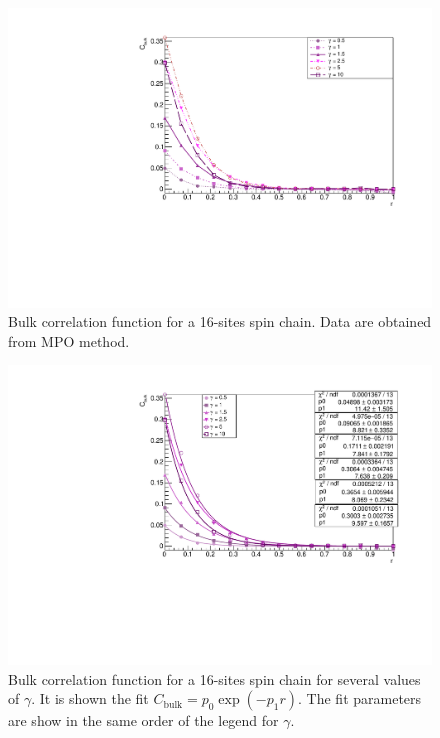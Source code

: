 \begin{figure}[H]
    \centering
    \includegraphics[scale=0.7]{Figures/16sites/16sites_CFBulkCONNVSgamma.pdf}
    \caption{Bulk correlation function for a 16-sites spin chain. Data are obtained from MPO method.}
    \label{fig:16sites_CFBulkCONNVSgamma}
\end{figure}

\begin{figure}[H]
    \centering
    \includegraphics[scale=0.7]{Figures/16sites/FIT_16sites_CFBulkCONN.pdf}
    \caption{Bulk correlation function for a 16-sites spin chain for several values of $\gamma$. It is shown the fit $C_{\text{bulk}} = p_0 \exp{(-p_1 r)}$. The fit parameters are show in the same order of the legend for $\gamma$.}
    \label{fig:FIT_16sites_CFBulkCONN}
\end{figure}

